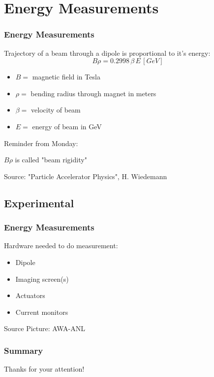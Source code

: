\documentclass[professionalfonts,t]{beamer}
\begin{document}
\section{Energy Measurements}
\begin{frame}
	\frametitle{Energy Measurements}
	Trajectory of a beam through a dipole is proportional to it's energy:
	\begin{equation}
		B \rho = 0.2998 \, \beta \, E \, [GeV]
	\end{equation}
	\begin{itemize}
		\item $B = $ magnetic field in Tesla
		\item $\rho =$ bending radius through magnet in meters
		\item $\beta =$ velocity of beam
		\item $E = $ energy of beam in GeV 
	\end{itemize}

\vspace{1em}
Reminder from Monday:

$B\rho$ is called "beam rigidity"

\vspace{1em}
Source: "Particle Accelerator Physics", H. Wiedemann
\end{frame}

\subsection{Experimental}
\begin{frame}
\frametitle{Energy Measurements}
\centering
\vspace{1em}

\begin{minipage}{0.35\textwidth}
Hardware needed to do measurement:
\begin{itemize}
	\item Dipole
	\item Imaging screen(s)
	\item Actuators
	\item Current monitors
\end{itemize}	
\end{minipage}\hfill \hfill
\begin{minipage}{0.6\textwidth}
\end{minipage}

\vspace{1em}
\hfill Source Picture: AWA-ANL
\end{frame}

\begin{frame}
	\frametitle{Summary}

	\large{Thanks for your attention!}
\end{frame}
\end{document}
